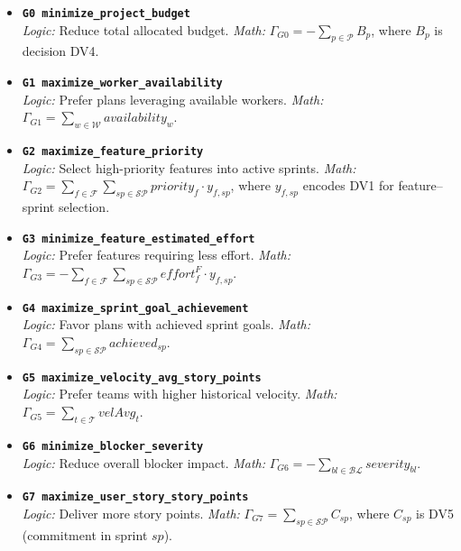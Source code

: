 \documentclass[11pt,a4paper]{article}
\begin{document}
\begin{itemize}[leftmargin=2em]
  \item \textbf{\texttt{G0 minimize\_project\_budget}} \\
    \textit{Logic:} Reduce total allocated budget. \quad
    \textit{Math:} $\Gamma_{G0} = - \sum_{p\in\mathcal{P}} B_p$, where $B_p$ is decision DV4. 

  \item \textbf{\texttt{G1 maximize\_worker\_availability}} \\
    \textit{Logic:} Prefer plans leveraging available workers. \quad
    \textit{Math:} $\Gamma_{G1} = \sum_{w\in\mathcal{W}} availability_w$.

  \item \textbf{\texttt{G2 maximize\_feature\_priority}} \\
    \textit{Logic:} Select high-priority features into active sprints. \quad
    \textit{Math:} $\Gamma_{G2} = \sum_{f\in\mathcal{F}}\sum_{sp\in\mathcal{SP}} priority_f \cdot y_{f,sp}$, where $y_{f,sp}$ encodes DV1 for feature--sprint selection.

  \item \textbf{\texttt{G3 minimize\_feature\_estimated\_effort}} \\
    \textit{Logic:} Prefer features requiring less effort. \quad
    \textit{Math:} $\Gamma_{G3} = - \sum_{f\in\mathcal{F}}\sum_{sp\in\mathcal{SP}} effort^{F}_f \cdot y_{f,sp}$.

  \item \textbf{\texttt{G4 maximize\_sprint\_goal\_achievement}} \\
    \textit{Logic:} Favor plans with achieved sprint goals. \quad
    \textit{Math:} $\Gamma_{G4} = \sum_{sp\in\mathcal{SP}} achieved_{sp}$.

  \item \textbf{\texttt{G5 maximize\_velocity\_avg\_story\_points}} \\
    \textit{Logic:} Prefer teams with higher historical velocity. \quad
    \textit{Math:} $\Gamma_{G5} = \sum_{t\in\mathcal{T}} velAvg_t$.

  \item \textbf{\texttt{G6 minimize\_blocker\_severity}} \\
    \textit{Logic:} Reduce overall blocker impact. \quad
    \textit{Math:} $\Gamma_{G6} = - \sum_{bl\in\mathcal{BL}} severity_{bl}$.

  \item \textbf{\texttt{G7 maximize\_user\_story\_story\_points}} \\
    \textit{Logic:} Deliver more story points. \quad
    \textit{Math:} $\Gamma_{G7} = \sum_{sp\in\mathcal{SP}} C_{sp}$, where $C_{sp}$ is DV5 (commitment in sprint $sp$).


\end{itemize}
\end{document}
